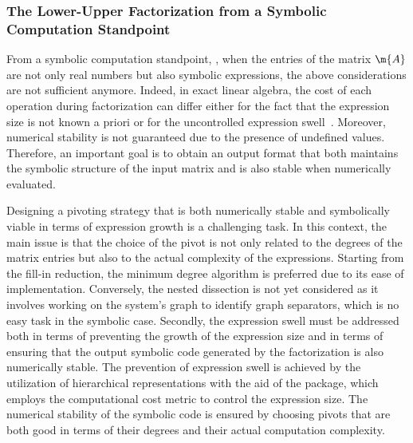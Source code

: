 \subsubsection{The Lower-Upper Factorization from a Symbolic Computation Standpoint}

From a symbolic computation standpoint, \ie{}, when the entries of the matrix $\m{A}$ are not only real numbers but also symbolic expressions, the above considerations are not sufficient anymore. Indeed, in exact linear algebra, the cost of each operation during factorization can differ either for the fact that the expression size is not known a priori or for the uncontrolled expression swell~\cite{zhou2006hierarchical}. Moreover, numerical stability is not guaranteed due to the presence of undefined values. Therefore, an important goal is to obtain an output format that both maintains the symbolic structure of the input matrix and is also stable when numerically evaluated.

Designing a pivoting strategy that is both numerically stable and symbolically viable in terms of expression growth is a challenging task. In this context, the main issue is that the choice of the pivot is not only related to the degrees of the matrix entries but also to the actual complexity of the expressions. Starting from the fill-in reduction, the minimum degree algorithm is preferred due to its ease of implementation. Conversely, the nested dissection is not yet considered as it involves working on the system's graph to identify graph separators, which is no easy task in the symbolic case. Secondly, the expression swell must be addressed both in terms of preventing the growth of the expression size and in terms of ensuring that the output symbolic code generated by the factorization is also numerically stable. The prevention of expression swell is achieved by the utilization of hierarchical representations with the aid of the \LEM{} package, which employs the computational cost metric to control the expression size. The numerical stability of the symbolic code is ensured by choosing pivots that are both good in terms of their degrees and their actual computation complexity.

